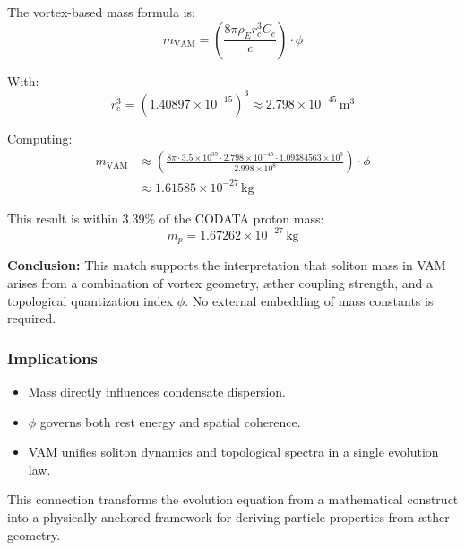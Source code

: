             The vortex-based mass formula is:
            \begin{equation}
            m_{\text{VAM}} = \left( \frac{8\pi \rho_E r_c^3 C_e}{c} \right) \cdot \phi
            \end{equation}

            With:
            \begin{equation}
            r_c^3 = (1.40897 \times 10^{-15})^3 \approx 2.798 \times 10^{-45} \, \text{m}^3
            \end{equation}

            Computing:
            \begin{align}
            m_{\text{VAM}} &\approx \left( \frac{8\pi \cdot 3.5 \times 10^{35} \cdot 2.798 \times 10^{-45} \cdot 1.09384563 \times 10^6}{2.998 \times 10^8} \right) \cdot \phi \\
            &\approx 1.61585 \times 10^{-27} \, \text{kg}
            \end{align}

            This result is within 3.39\% of the CODATA proton mass:
            \begin{equation}
            m_p = 1.67262 \times 10^{-27} \, \text{kg}
            \end{equation}

            \textbf{Conclusion:} This match supports the interpretation that soliton mass in VAM arises from a combination of vortex geometry, æther coupling strength, and a topological quantization index $\phi$. No external embedding of mass constants is required.


            \subsubsection*{Implications}

            \begin{itemize}
              \item Mass directly influences condensate dispersion.
              \item $\phi$ governs both rest energy and spatial coherence.
              \item VAM unifies soliton dynamics and topological spectra in a single evolution law.
            \end{itemize}

            This connection transforms the evolution equation from a mathematical construct into a physically anchored framework for deriving particle properties from æther geometry.

